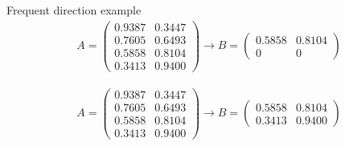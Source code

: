 \documentclass[first=dgreen,second=purple,logo=redque]{aaltoslides}
\begin{document}
\begin{frame}[allowframebreaks=1]{Frequent direction example}
\framebreak
\begin{align}
  A = \begin{pmatrix}
       0.9387 & 0.3447 \\[0.3em] 
       0.7605 & 0.6493 \\[0.3em]
       0.5858 & 0.8104 \\[0.3em]
       0.3413 & 0.9400
     \end{pmatrix} 
  \rightarrow
  B = \begin{pmatrix}
       0.5858 & 0.8104 \\[0.3em]
       0 & 0
     \end{pmatrix} 
\end{align}


\framebreak
\begin{align}
  A = \begin{pmatrix}
       0.9387 & 0.3447 \\[0.3em] 
       0.7605 & 0.6493 \\[0.3em]
       0.5858 & 0.8104 \\[0.3em]
       0.3413 & 0.9400
     \end{pmatrix} 
  \rightarrow
  B = \begin{pmatrix}
       0.5858 & 0.8104 \\[0.3em]
       0.3413 & 0.9400
     \end{pmatrix} 
\end{align}
\end{frame}
\end{document}
